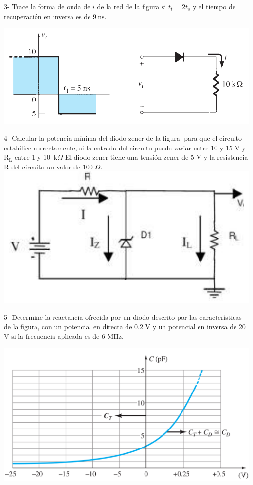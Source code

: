 \documentclass[10pt,letterpaper]{article}
\begin{document}
3- Trace la forma de onda de $i$ de la red de la figura si $t_t = 2t_s$ y el tiempo de recuperación en inversa es de $9 \: \mathrm{ns}$.

\includegraphics[scale=0.35]{c3.png} 

4- Calcular la potencia mínima del diodo zener de la figura, para que el circuito estabilice correctamente, si la entrada del circuito puede variar entre 10 y 15 V y $\mathrm{R_L}$ entre 1 y 10 $\: \mathrm{k}\Omega$ El diodo zener tiene una tensión zener de 5 V y la resistencia R del circuito un valor de 100 $\Omega$. \\

\includegraphics[scale=0.35]{c4.png}

5- Determine la reactancia ofrecida por un diodo descrito por las características de la figura, con un potencial en directa de 0.2 V y un potencial en inversa de 20 V si la frecuencia aplicada es de 6 MHz. 

\includegraphics[scale=0.35]{c5.png}
\end{document}

